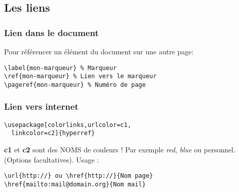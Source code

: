         \subsection{Les liens}
            \subsubsection{Lien dans le document}
                Pour référencer un élément du document sur une autre page:
                \begin{lstlisting}
\label{mon-marqueur} % Marqueur
\ref{mon-marqueur} % Lien vers le marqueur
\pageref{mon-marqueur} % Numéro de page
                \end{lstlisting}
            \subsubsection{Lien vers internet}
                \begin{lstlisting}
\usepackage[colorlinks,urlcolor=c1,
  linkcolor=c2]{hyperref}
                \end{lstlisting}
                \textbf{c1} et \textbf{c2} sont des NOMS de couleurs ! Par exemple \textit{red}, \textit{blue} ou personnel. (Options facultatives). Usage :
                \begin{lstlisting}
\url{http://} ou \href{http://}{Nom page}
\href{mailto:mail@domain.org}{Nom mail}
                \end{lstlisting}
